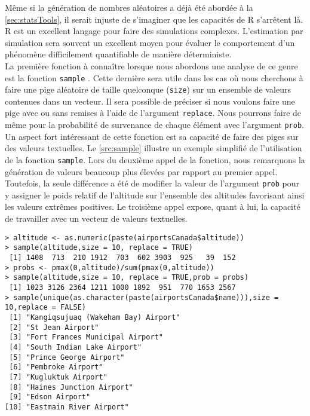 Même si la génération de nombres aléatoires a déjà été abordée à la \autoref{sec:statsTools}, il serait injuste de s'imaginer que les capacités de R s'arrêtent là. R est un excellent langage pour faire des simulations complexes. L'estimation par simulation sera souvent un excellent moyen pour évaluer le comportement d'un phénomène difficilement quantifiable de manière déterministe. \\

La première fonction à connaître lorsque nous abordons une analyse de ce genre est la fonction \texttt{sample} \cite{Rfunction:sample}. Cette dernière sera utile dans les cas où nous cherchons à faire une pige aléatoire de taille quelconque (\texttt{size}) sur un ensemble de valeurs contenues dans un vecteur. Il sera possible de préciser si nous voulons faire une pige avec ou sans remises à l'aide de l'argument \texttt{replace}. Nous pourrons faire de même pour la probabilité de survenance de chaque élément avec l'argument \texttt{prob}. Un aspect fort intéressant de cette fonction est sa capacité de faire des piges sur des valeurs textuelles. Le \autoref{src:sample} illustre un exemple simplifié de l'utilisation de la fonction \texttt{sample}. Lors du deuxième appel de la fonction, nous remarquons la génération de valeurs beaucoup plus élevées par rapport au premier appel. Toutefois, la seule différence a été de modifier la valeur de l'argument \texttt{prob} pour y assigner le poids relatif de l'altitude sur l'ensemble des altitudes favorisant ainsi les valeurs extrêmes positives. Le troisième appel expose, quant à lui, la capacité de travailler avec un vecteur de valeurs textuelles. \\

\begin{lstlisting}[caption = Pige aléatoire sur support vectoriel,label=src:sample]
> altitude <- as.numeric(paste(airportsCanada$altitude))
> sample(altitude,size = 10, replace = TRUE)
 [1] 1408  713  210 1912  703  602 3903  925   39  152
> probs <- pmax(0,altitude)/sum(pmax(0,altitude))
> sample(altitude,size = 10, replace = TRUE,prob = probs)
 [1] 1023 3126 2364 1211 1000 1892  951  770 1653 2567
> sample(unique(as.character(paste(airportsCanada$name))),size = 10,replace = FALSE)
 [1] "Kangiqsujuaq (Wakeham Bay) Airport"
 [2] "St Jean Airport"                   
 [3] "Fort Frances Municipal Airport"    
 [4] "South Indian Lake Airport"         
 [5] "Prince George Airport"             
 [6] "Pembroke Airport"                  
 [7] "Kugluktuk Airport"                 
 [8] "Haines Junction Airport"           
 [9] "Edson Airport"                     
[10] "Eastmain River Airport"  
\end{lstlisting}

